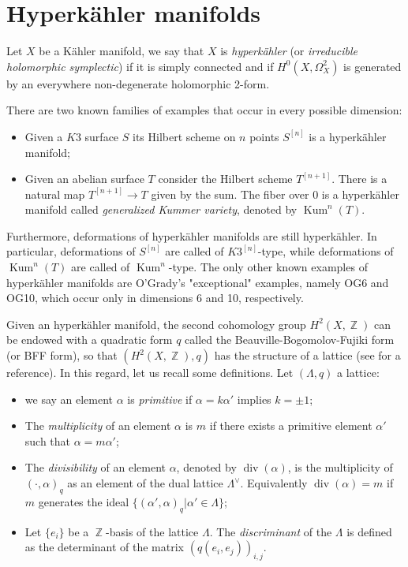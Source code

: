 \documentclass{article}
\DeclareMathOperator{\bZ}{\mathbb{Z}}
\DeclareMathOperator{\Kum}{Kum}
\DeclareMathOperator{\Div}{div}
\newcommand{\hilb}[2][n]{#2^{[#1]}}
\begin{document}
\section{Hyperk\"ahler manifolds}\label{sect_hyper}

Let $X$ be a K\"ahler manifold, we say that $X$ is \emph{hyperk\"ahler} (or \emph{irreducible holomorphic symplectic}) if it is simply connected and if $H^0(X,\Omega^2_X)$ is generated by an everywhere non-degenerate holomorphic 2-form.

There are two known families of examples that occur in every possible dimension:
\begin{itemize}
    \item Given a $K3$ surface $S$ its Hilbert scheme on $n$ points $\hilb[n]{S}$ is a hyperk\"ahler manifold;
    \item  Given an abelian surface $T$ consider the Hilbert scheme $\hilb[n+1]{T}$. There is a natural map $\hilb[n+1]{T}\to T$ given by the sum. The fiber over $0$ is a hyperk\"ahler manifold called \emph{generalized Kummer variety}, denoted by $\Kum^n(T)$.
\end{itemize}

Furthermore, deformations of hyperk\"ahler manifolds are still hyperk\"ahler. In particular, deformations of $\hilb[n]{S}$ are called of $\hilb[n]{K3}$-type, while deformations of $\Kum^n(T)$ are called of $\Kum^n$-type.
The only other known examples of hyperk\"ahler manifolds are O'Grady's "exceptional" examples, namely OG6 and OG10, which occur only in dimensions 6 and 10, respectively. 

Given an hyperk\"ahler manifold, the second cohomology group $H^2(X,\bZ)$ can be endowed with a quadratic form $q$ called the Beauville-Bogomolov-Fujiki form (or BFF form), so that $(H^2(X,\bZ),q)$ has the structure of a lattice (see \cite{huybrechts1997compacthyperkaehlermanifoldsbasic} for a reference). In this regard, let us recall some definitions. Let $(\Lambda,q)$ a lattice:
\begin{itemize}
    \item we say an element $\alpha$ is \emph{primitive} if $\alpha=k\alpha'$ implies $k=\pm1$;
    \item The \emph{multiplicity} of an element $\alpha$ is $m$ if there exists a primitive element $\alpha'$ such that $\alpha=m\alpha'$;
    \item The \emph{divisibility} of an element $\alpha$, denoted by $\Div(\alpha)$, is the multiplicity of $(\cdot,\alpha)_q$ as an element of the dual lattice $\Lambda^\vee$. Equivalently $\Div(\alpha)=m$ if $m$ generates the ideal $\{(\alpha',\alpha)_q|\alpha'\in\Lambda\}$;
    \item Let $\{e_i\}$ be a $\bZ$-basis of the lattice $\Lambda$. The \emph{discriminant} of the $\Lambda$ is defined as the determinant of the matrix $(q(e_i,e_j))_{i,j}$.
\end{itemize}
\end{document}
